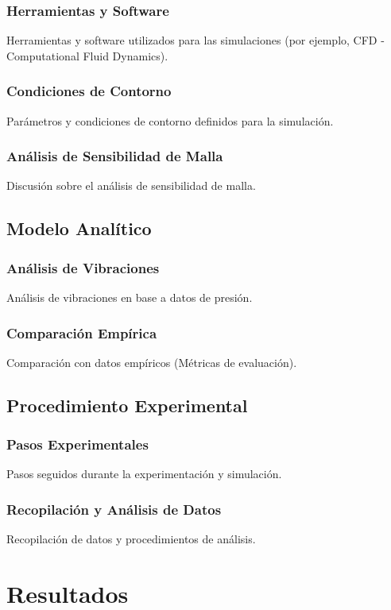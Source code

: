 \documentclass[journal,article,submit,pdftex,moreauthors]{Definitions/mdpi}
\begin{document}
\subsubsection{Herramientas y Software}
Herramientas y software utilizados para las simulaciones (por ejemplo, CFD - Computational Fluid Dynamics).

\subsubsection{Condiciones de Contorno}
Parámetros y condiciones de contorno definidos para la simulación.

\subsubsection{Análisis de Sensibilidad de Malla}
Discusión sobre el análisis de sensibilidad de malla.

\subsection{Modelo Analítico}
\subsubsection{Análisis de Vibraciones}
Análisis de vibraciones en base a datos de presión.

\subsubsection{Comparación Empírica}
Comparación con datos empíricos (Métricas de evaluación).

\subsection{Procedimiento Experimental}
\subsubsection{Pasos Experimentales}
Pasos seguidos durante la experimentación y simulación.

\subsubsection{Recopilación y Análisis de Datos}
Recopilación de datos y procedimientos de análisis.

\section{Resultados}
\end{document}
